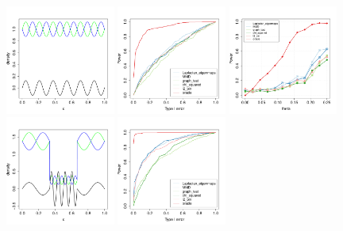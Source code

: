 \documentclass{article}
\newcommand{\1}{\mathbf{1}}
\theoremstyle{alden}
\theoremstyle{aldenthm}
\theoremstyle{definition}
\theoremstyle{remark}
\begin{document}
\begin{figure}
	\label{fig:fig3}
	\centering
	\includegraphics[width=0.32\textwidth]{plots/sin_density}
	\includegraphics[width=0.32\textwidth]{plots/sin_ROC}
	\includegraphics[width=0.32\textwidth]{plots/sin_theta}
	\includegraphics[width=0.32\textwidth]{plots/stepfunction_sin_density}
	\includegraphics[width=0.32\textwidth]{plots/stepfunction_sin_ROC}

\end{figure}
\end{document}
